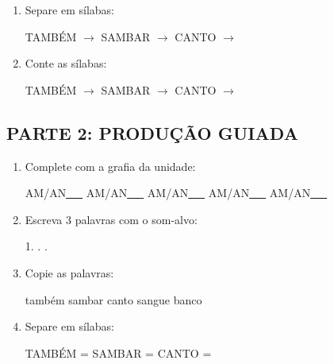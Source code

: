 \begin{exercicio}
\begin{enumerate}
  \item Separe em sílabas:
  \begin{center}
  TAMBÉM $\rightarrow$ \underline{\hspace{1cm}} \quad SAMBAR $\rightarrow$ \underline{\hspace{1cm}} \quad CANTO $\rightarrow$ \underline{\hspace{1cm}}
  \end{center}

  \item Conte as sílabas:
  \begin{center}
  TAMBÉM $\rightarrow$ \underline{\hspace{0.9cm}} \quad SAMBAR $\rightarrow$ \underline{\hspace{0.9cm}} \quad CANTO $\rightarrow$ \underline{\hspace{0.9cm}}
  \end{center}

\end{enumerate}

\subsection*{PARTE 2: PRODUÇÃO GUIADA}

\begin{enumerate}[resume]

  \item Complete com a grafia da unidade:
  \begin{center}
  AM/AN\underline{~~~} \quad AM/AN\underline{~~~} \quad AM/AN\underline{~~~} \quad AM/AN\underline{~~~} \quad AM/AN\underline{~~~}
  \end{center}

  \item Escreva 3 palavras com o som-alvo:
  \begin{center}
  1. \underline{\hspace{3cm}} . \underline{\hspace{3cm}} . \underline{\hspace{3cm}}
  \end{center}

  \item Copie as palavras:
  \begin{center}
  também \quad sambar \quad canto \quad sangue \quad banco
  \end{center}

  \item Separe em sílabas:
  \begin{center}
  TAMBÉM = \underline{\hspace{1cm}} \underline{\hspace{1cm}} \quad SAMBAR = \underline{\hspace{1cm}} \underline{\hspace{1cm}} \quad CANTO = \underline{\hspace{1cm}} \underline{\hspace{1cm}}
  \end{center}


\end{enumerate}
\end{exercicio}
